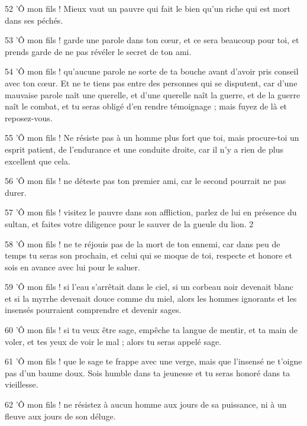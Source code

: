 \par 52 'Ô mon fils ! Mieux vaut un pauvre qui fait le bien qu'un riche qui est mort dans ses péchés.

\par 53 'Ô mon fils ! garde une parole dans ton cœur, et ce sera beaucoup pour toi, et prends garde de ne pas révéler le secret de ton ami.

\par 54 'Ô mon fils ! qu'aucune parole ne sorte de ta bouche avant d'avoir pris conseil avec ton cœur. Et ne te tiens pas entre des personnes qui se disputent, car d'une mauvaise parole naît une querelle, et d'une querelle naît la guerre, et de la guerre naît le combat, et tu seras obligé d'en rendre témoignage ; mais fuyez de là et reposez-vous.

\par 55 'Ô mon fils ! Ne résiste pas à un homme plus fort que toi, mais procure-toi un esprit patient, de l'endurance et une conduite droite, car il n'y a rien de plus excellent que cela.

\par 56 'Ô mon fils ! ne déteste pas ton premier ami, car le second pourrait ne pas durer.

\par 57 'Ô mon fils ! visitez le pauvre dans son affliction, parlez de lui en présence du sultan, et faites votre diligence pour le sauver de la gueule du lion. 2

\par 58 'Ô mon fils ! ne te réjouis pas de la mort de ton ennemi, car dans peu de temps tu seras son prochain, et celui qui se moque de toi, respecte et honore et sois en avance avec lui pour le saluer.

\par 59 'Ô mon fils ! si l'eau s'arrêtait dans le ciel, si un corbeau noir devenait blanc et si la myrrhe devenait douce comme du miel, alors les hommes ignorants et les insensés pourraient comprendre et devenir sages.

\par 60 'Ô mon fils ! si tu veux être sage, empêche ta langue de mentir, et ta main de voler, et tes yeux de voir le mal ; alors tu seras appelé sage.

\par 61 'Ô mon fils ! que le sage te frappe avec une verge, mais que l'insensé ne t'oigne pas d'un baume doux. Sois humble dans ta jeunesse et tu seras honoré dans ta vieillesse.

\par 62 'Ô mon fils ! ne résistez à aucun homme aux jours de sa puissance, ni à un fleuve aux jours de son déluge.

